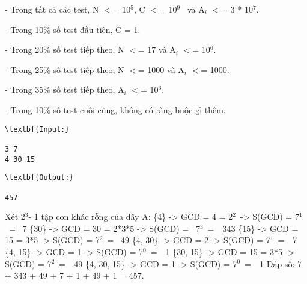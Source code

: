 - Trong tất cả các test, N $<$= 10$^5$, C $<$= 10$^9$  và A$_i$ $<$= 3 * 10$^7$.

- Trong 10\% số test đầu tiên, C = 1.

- Trong 20\% số test tiếp theo, N $<$= 17 và A$_i$ $<$= 10$^6$.

- Trong 25\% số test tiếp theo, N $<$= 1000 và A$_i$ $<$= 1000.

- Trong 35\% số test tiếp theo, A$_i$ $<$= 10$^6$.

- Trong 10\% số test cuối cùng, không có ràng buộc gì thêm.
\begin{verbatim}
\textbf{Input:}

3 7
4 30 15\end{verbatim}
\begin{verbatim}
\textbf{Output:}

457\end{verbatim}
Xét 2$^3 $- 1 tập con khác rỗng của dãy A:
\{4\} -> GCD = 4 = 2$^2$ -> S(GCD) = 7$^1$ =  7
\{30\} -> GCD = 30 = 2*3*5 -> S(GCD) =  7$^3$ =  343
\{15\} -> GCD = 15 = 3*5 -> S(GCD) = 7$^2$ =  49
\{4, 30\} -> GCD = 2 -> S(GCD) = 7$^1$ =  7
\{4, 15\} -> GCD = 1 -> S(GCD) = 7$^0$ =  1
\{30, 15\} -> GCD = 15 = 3*5 -> S(GCD) = 7$^2$ =  49
\{4, 30, 15\} -> GCD = 1 -> S(GCD) = 7$^0$ =  1
Đáp số: 7 + 343 + 49 + 7 + 1 + 49 + 1 = 457.